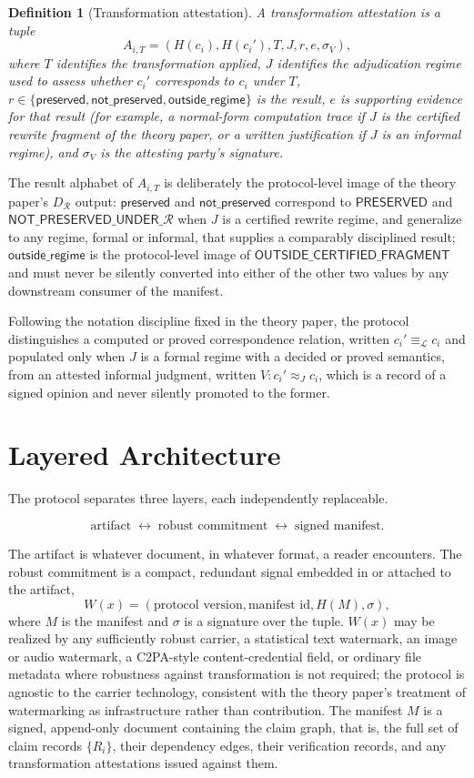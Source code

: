 \documentclass[11pt]{article}
\newtheorem{definition}{Definition}
\begin{document}
\begin{definition}[Transformation attestation]
A transformation attestation is a tuple
\[
A_{i,T} = (H(c_i), H(c_i'), T, J, r, e, \sigma_V),
\]
where $T$ identifies the transformation applied, $J$ identifies the adjudication regime used to assess whether $c_i'$ corresponds to $c_i$ under $T$, $r \in \{\textsf{preserved}, \textsf{not\_preserved}, \textsf{outside\_regime}\}$ is the result, $e$ is supporting evidence for that result (for example, a normal-form computation trace if $J$ is the certified rewrite fragment of the theory paper, or a written justification if $J$ is an informal regime), and $\sigma_V$ is the attesting party's signature.
\end{definition}

The result alphabet of $A_{i,T}$ is deliberately the protocol-level image of the theory paper's $D_{\mathcal{R}}$ output: $\textsf{preserved}$ and $\textsf{not\_preserved}$ correspond to $\textsf{PRESERVED}$ and $\textsf{NOT\_PRESERVED\_UNDER\_}\mathcal{R}$ when $J$ is a certified rewrite regime, and generalize to any regime, formal or informal, that supplies a comparably disciplined result; $\textsf{outside\_regime}$ is the protocol-level image of $\textsf{OUTSIDE\_CERTIFIED\_FRAGMENT}$ and must never be silently converted into either of the other two values by any downstream consumer of the manifest.

Following the notation discipline fixed in the theory paper, the protocol distinguishes a computed or proved correspondence relation, written $c_i' \equiv_{\mathcal{L}} c_i$ and populated only when $J$ is a formal regime with a decided or proved semantics, from an attested informal judgment, written $V : c_i' \approx_J c_i$, which is a record of a signed opinion and never silently promoted to the former.

\section{Layered Architecture}

The protocol separates three layers, each independently replaceable.

\[
\text{artifact} \;\leftrightarrow\; \text{robust commitment} \;\leftrightarrow\; \text{signed manifest}.
\]

The artifact is whatever document, in whatever format, a reader encounters. The robust commitment is a compact, redundant signal embedded in or attached to the artifact,
\[
W(x) = (\text{protocol version}, \text{manifest id}, H(M), \sigma),
\]
where $M$ is the manifest and $\sigma$ is a signature over the tuple. $W(x)$ may be realized by any sufficiently robust carrier, a statistical text watermark, an image or audio watermark, a C2PA-style content-credential field, or ordinary file metadata where robustness against transformation is not required; the protocol is agnostic to the carrier technology, consistent with the theory paper's treatment of watermarking as infrastructure rather than contribution. The manifest $M$ is a signed, append-only document containing the claim graph, that is, the full set of claim records $\{R_i\}$, their dependency edges, their verification records, and any transformation attestations issued against them.
\end{document}
